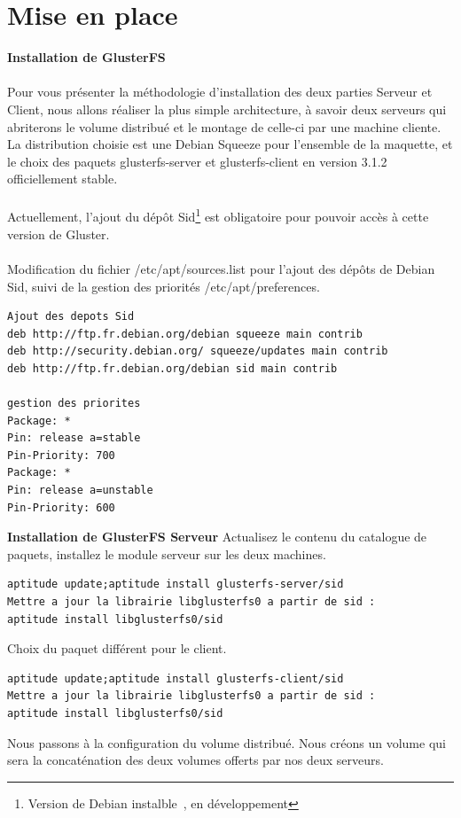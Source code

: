 \documentclass[12pt]{report}
\begin{document}
\section{Mise en place}
\textbf{Installation de GlusterFS}\\\\
Pour vous présenter la méthodologie d'installation des deux parties Serveur et Client, nous allons réaliser la plus simple architecture, à savoir deux serveurs qui abriterons le volume distribué et le montage de celle-ci par une machine cliente.\\
La distribution choisie est une Debian Squeeze pour l'ensemble de la maquette, et le choix des paquets glusterfs-server et glusterfs-client en version 3.1.2 officiellement stable.\\\\
Actuellement, l'ajout du dépôt Sid\footnote{Version de Debian \og instalble\fg~, en développement} est obligatoire pour pouvoir accès à cette version de Gluster.\\\\
Modification du fichier /etc/apt/sources.list pour l'ajout des dépôts de Debian Sid, suivi de la gestion des priorités /etc/apt/preferences.
\begin{lstlisting}
Ajout des depots Sid
deb http://ftp.fr.debian.org/debian squeeze main contrib
deb http://security.debian.org/ squeeze/updates main contrib
deb http://ftp.fr.debian.org/debian sid main contrib

gestion des priorites
Package: *
Pin: release a=stable
Pin-Priority: 700
Package: *
Pin: release a=unstable
Pin-Priority: 600
\end{lstlisting}
\textbf{Installation de GlusterFS Serveur}
Actualisez le contenu du catalogue de paquets, installez le module serveur sur les deux machines.
\begin{lstlisting}
aptitude update;aptitude install glusterfs-server/sid
Mettre a jour la librairie libglusterfs0 a partir de sid : 
aptitude install libglusterfs0/sid
	  \end{lstlisting}
Choix du paquet différent pour le client.
\begin{lstlisting}
aptitude update;aptitude install glusterfs-client/sid
Mettre a jour la librairie libglusterfs0 a partir de sid : 
aptitude install libglusterfs0/sid
	  \end{lstlisting}
Nous passons à la configuration du volume distribué. Nous créons un volume qui sera la concaténation des deux volumes offerts par nos deux serveurs.\\
\end{document}
